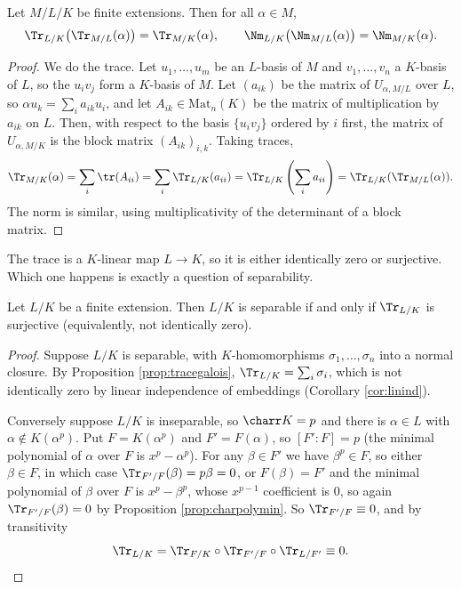 \begin{proposition}[Transitivity]
	Let $M/L/K$ be finite extensions. Then for all $\alpha \in M$,
	$$\Tr_{L/K}\big(\Tr_{M/L}(\alpha)\big) = \Tr_{M/K}(\alpha), \qquad \Nm_{L/K}\big(\Nm_{M/L}(\alpha)\big) = \Nm_{M/K}(\alpha).$$
\end{proposition}

\begin{proof}
	We do the trace. Let $u_1,\dots,u_m$ be an $L$-basis of $M$ and $v_1,\dots,v_n$ a $K$-basis of $L$, so the $u_iv_j$ form a $K$-basis of $M$. Let $(a_{ik})$ be the matrix of $U_{\alpha, M/L}$ over $L$, so $\alpha u_k = \sum_i a_{ik}u_i$, and let $A_{ik}\in\mathrm{Mat}_n(K)$ be the matrix of multiplication by $a_{ik}$ on $L$. Then, with respect to the basis $\{u_iv_j\}$ ordered by $i$ first, the matrix of $U_{\alpha,M/K}$ is the block matrix $(A_{ik})_{i,k}$. Taking traces,
	$$\Tr_{M/K}(\alpha) = \sum_i \tr(A_{ii}) = \sum_i \Tr_{L/K}(a_{ii}) = \Tr_{L/K}\left(\sum_i a_{ii}\right) = \Tr_{L/K}(\Tr_{M/L}(\alpha)).$$
	The norm is similar, using multiplicativity of the determinant of a block matrix.
\end{proof}

The trace is a $K$-linear map $L \to K$, so it is either identically zero or surjective. Which one happens is exactly a question of separability.

\begin{theorem}\label{thm:tracesurj}
	Let $L/K$ be a finite extension. Then $L/K$ is separable if and only if $\Tr_{L/K}$ is surjective (equivalently, not identically zero).
\end{theorem}

\begin{proof}
	Suppose $L/K$ is separable, with $K$-homomorphisms $\sigma_1,\dots,\sigma_n$ into a normal closure. By Proposition \ref{prop:tracegalois}, $\Tr_{L/K} = \sum_i\sigma_i$, which is not identically zero by linear independence of embeddings (Corollary \ref{cor:linind}).

	Conversely suppose $L/K$ is inseparable, so $\charr K = p$ and there is $\alpha \in L$ with $\alpha \notin K(\alpha^p)$. Put $F = K(\alpha^p) $ and $F' = F(\alpha)$, so $[F' : F] = p$ (the minimal polynomial of $\alpha$ over $F$ is $x^p - \alpha^p$). For any $\beta \in F'$ we have $\beta^p \in F$, so either $\beta \in F$, in which case $\Tr_{F'/F}(\beta) = p\beta = 0$, or $F(\beta) = F'$ and the minimal polynomial of $\beta$ over $F$ is $x^p-\beta^p$, whose $x^{p-1}$ coefficient is $0$, so again $\Tr_{F'/F}(\beta) = 0$ by Proposition \ref{prop:charpolymin}. So $\Tr_{F'/F} \equiv 0$, and by transitivity
	$$\Tr_{L/K} = \Tr_{F/K}\circ\Tr_{F'/F}\circ\Tr_{L/F'} \equiv 0. \qedhere$$
\end{proof}

